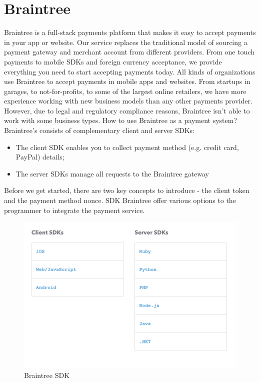 \section{Braintree}
\label{sec:braintree}
Braintree is a full-stack payments platform that makes it easy to accept payments in your app or website. Our service replaces the traditional model of sourcing a payment gateway and merchant account from different providers. From one touch payments to mobile SDKs and foreign currency acceptance, we provide everything you need to start accepting payments today.
\newline
All kinds of organizations use Braintree to accept payments in mobile apps and websites. From startups in garages, to not-for-profits, to some of the largest online retailers, we have more experience working with new business models than any other payments provider. However, due to legal and regulatory compliance reasons, Braintree isn't able to work with some business types. How to use Braintree as a payment system?
Braintree's  consists of complementary client and server SDKs:
\begin{itemize}
  \item The client SDK enables you to collect payment method (e.g. credit card, PayPal) details;
  \item The server SDKs manage all requests to the Braintree gateway
\end{itemize}
Before we get started, there are two key concepts to introduce - the client token and the payment method nonce.
\newline
SDK Braintree offer various options to the programmer to integrate the payment service.
\begin{figure}[htb]
  \centering
  \includegraphics[width=1.0\linewidth]{images/chapter4/braintree-sdk.png}\hfill
  \caption[Braintree SDK]{Braintree SDK}
\label{fig:braintree_sdk}
\end{figure}
